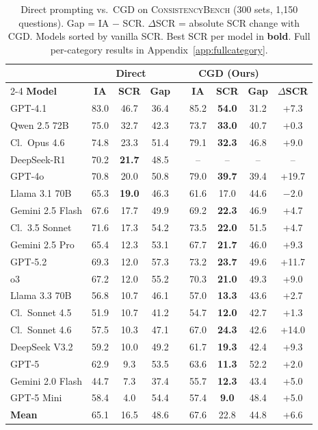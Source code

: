 \documentclass{article}
\newcommand{\bench}{\textsc{ConsistencyBench}}
\newcommand{\method}{\textsc{CGD}}
\begin{document}
\begin{table}[t]
\caption{Direct prompting vs.\ \method{} on \bench{} (300 sets, 1,150 questions). Gap = IA $-$ SCR. $\Delta$SCR = absolute SCR change with \method{}. Models sorted by vanilla SCR. Best SCR per model in \textbf{bold}. Full per-category results in Appendix~\ref{app:fullcategory}.}
\label{tab:main}
\vspace{-0.5em}
\begin{center}
\scriptsize
\setlength{\tabcolsep}{2.8pt}
\begin{tabular}{l ccc c ccc c}
\toprule
 & \multicolumn{3}{c}{\textbf{Direct}} & & \multicolumn{3}{c}{\textbf{\method{} (Ours)}} & \\
\cmidrule{2-4} \cmidrule{6-8}
\textbf{Model} & \textbf{IA} & \textbf{SCR} & \textbf{Gap} & & \textbf{IA} & \textbf{SCR} & \textbf{Gap} & \textbf{$\Delta$SCR} \\
\midrule
GPT-4.1 & 83.0 & 46.7 & 36.4 & & 85.2 & \textbf{54.0} & 31.2 & +7.3 \\
Qwen 2.5 72B & 75.0 & 32.7 & 42.3 & & 73.7 & \textbf{33.0} & 40.7 & +0.3 \\
Cl.\ Opus 4.6 & 74.8 & 23.3 & 51.4 & & 79.1 & \textbf{32.3} & 46.8 & +9.0 \\
DeepSeek-R1 & 70.2 & \textbf{21.7} & 48.5 & & -- & -- & -- & -- \\
GPT-4o & 70.8 & 20.0 & 50.8 & & 79.0 & \textbf{39.7} & 39.4 & +19.7 \\
Llama 3.1 70B & 65.3 & \textbf{19.0} & 46.3 & & 61.6 & 17.0 & 44.6 & $-$2.0 \\
Gemini 2.5 Flash & 67.6 & 17.7 & 49.9 & & 69.2 & \textbf{22.3} & 46.9 & +4.7 \\
Cl.\ 3.5 Sonnet & 71.6 & 17.3 & 54.2 & & 73.5 & \textbf{22.0} & 51.5 & +4.7 \\
Gemini 2.5 Pro & 65.4 & 12.3 & 53.1 & & 67.7 & \textbf{21.7} & 46.0 & +9.3 \\
GPT-5.2 & 69.3 & 12.0 & 57.3 & & 73.2 & \textbf{23.7} & 49.6 & +11.7 \\
o3 & 67.2 & 12.0 & 55.2 & & 70.3 & \textbf{21.0} & 49.3 & +9.0 \\
Llama 3.3 70B & 56.8 & 10.7 & 46.1 & & 57.0 & \textbf{13.3} & 43.6 & +2.7 \\
Cl.\ Sonnet 4.5 & 51.9 & 10.7 & 41.2 & & 54.7 & \textbf{12.0} & 42.7 & +1.3 \\
Cl.\ Sonnet 4.6 & 57.5 & 10.3 & 47.1 & & 67.0 & \textbf{24.3} & 42.6 & +14.0 \\
DeepSeek V3.2 & 59.2 & 10.0 & 49.2 & & 61.7 & \textbf{19.3} & 42.4 & +9.3 \\
GPT-5 & 62.9 & 9.3 & 53.5 & & 63.6 & \textbf{11.3} & 52.2 & +2.0 \\
Gemini 2.0 Flash & 44.7 & 7.3 & 37.4 & & 55.7 & \textbf{12.3} & 43.4 & +5.0 \\
GPT-5 Mini & 58.4 & 4.0 & 54.4 & & 57.4 & \textbf{9.0} & 48.4 & +5.0 \\
\midrule
\textbf{Mean} & 65.1 & 16.5 & 48.6 & & 67.6 & 22.8 & 44.8 & +6.6 \\
\bottomrule
\end{tabular}
\end{center}
\vspace{-0.5em}
\end{table}
\end{document}
